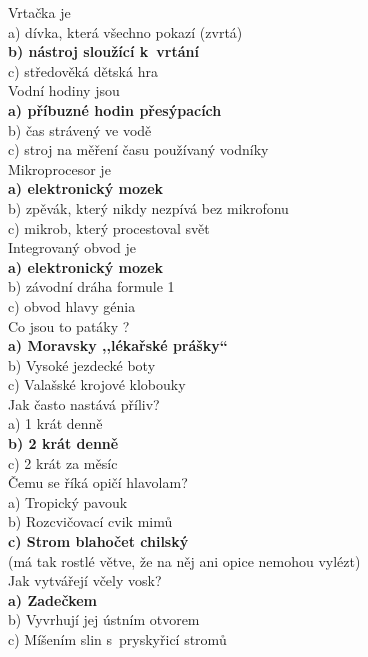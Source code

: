 \begin{multicols}{4}
\noindent
Vrtačka je\\
a) dívka, která všechno pokazí (zvrtá)\\
\textbf{b) nástroj sloužící k~vrtání}\\
c) středověká dětská hra\\

\noindent
Vodní hodiny jsou\\
\textbf{a) příbuzné hodin přesýpacích}\\
b) čas strávený ve vodě\\
c) stroj na měření času používaný vodníky\\

\noindent
Mikroprocesor je\\
\textbf{a) elektronický mozek}\\
b) zpěvák, který nikdy nezpívá bez mikrofonu\\
c) mikrob, který procestoval svět\\

\noindent
Integrovaný obvod je\\
\textbf{a) elektronický mozek}\\
b) závodní dráha formule 1\\
c) obvod hlavy génia\\

\noindent
Co jsou to patáky ?\\
\textbf{a) Moravsky ,,lékařské prášky``}\\
b) Vysoké jezdecké boty\\
c) Valašské krojové klobouky\\

\noindent
Jak často nastává příliv?\\
a) 1 krát denně\\
\textbf{b) 2 krát denně}\\
c) 2 krát za měsíc\\

\noindent
Čemu se říká opičí hlavolam?\\
a) Tropický pavouk\\
b) Rozcvičovací cvik mimů\\
\textbf{c) Strom blahočet chilský}\\
(má tak rostlé větve, že na něj ani opice nemohou vylézt)\\

\noindent
Jak vytvářejí včely vosk?\\
\textbf{a) Zadečkem}\\
b) Vyvrhují jej ústním otvorem\\
c) Míšením slin s~pryskyřicí stromů\\


\end{multicols}
